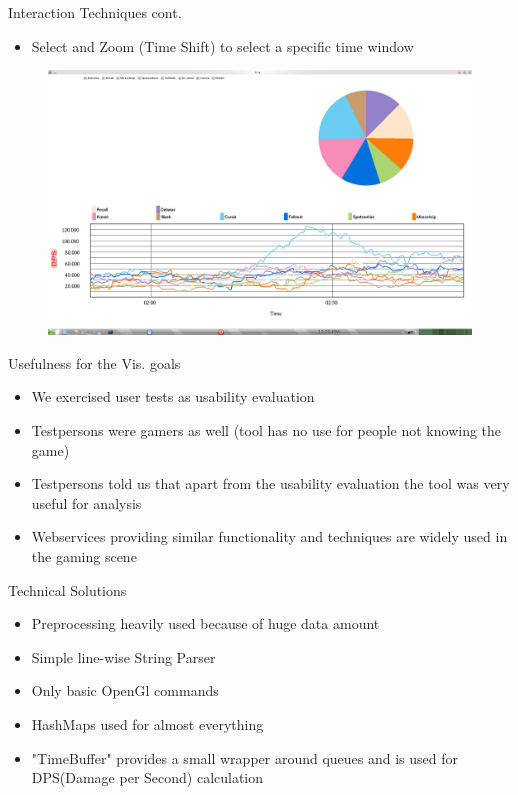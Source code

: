 \documentclass{beamer}
\begin{document}
\begin{frame}{Interaction Techniques cont.}
\begin{itemize}
	\item Select and Zoom (Time Shift) to select a specific time window
\end{itemize}
	\begin{figure}
		\includegraphics[width=\textwidth]{time.png}
	\end{figure}
\end{frame}

\begin{frame}{Usefulness for the Vis. goals}
\begin{itemize}
	\item We exercised user tests as usability evaluation
	\item Testpersons were gamers as well (tool has no use for people not knowing the game)
	\item Testpersons told us that apart from the usability evaluation the tool was very useful for analysis
	\item Webservices providing similar functionality and techniques are widely used in the gaming scene
\end{itemize}
\end{frame}

\begin{frame}{Technical Solutions}
\begin{itemize}
	\item Preprocessing heavily used because of huge data amount
	\item Simple line-wise String Parser
	\item Only basic OpenGl commands
	\item HashMaps used for almost everything
	\item "TimeBuffer" provides a small wrapper around queues and is used for DPS(Damage per Second) calculation
\end{itemize}
\end{frame}
\end{document}
